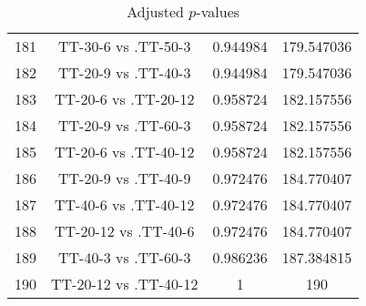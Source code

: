 \documentclass[a4paper,10pt]{article}
\begin{document}
\begin{landscape}
\begin{table}[!htp]
\begin{tabular}{cccc}
181&TT-30-6 vs .TT-50-3&0.944984&179.547036\\
182&TT-20-9 vs .TT-40-3&0.944984&179.547036\\
183&TT-20-6 vs .TT-20-12&0.958724&182.157556\\
184&TT-20-9 vs .TT-60-3&0.958724&182.157556\\
185&TT-20-6 vs .TT-40-12&0.958724&182.157556\\
186&TT-20-9 vs .TT-40-9&0.972476&184.770407\\
187&TT-40-6 vs .TT-40-12&0.972476&184.770407\\
188&TT-20-12 vs .TT-40-6&0.972476&184.770407\\
189&TT-40-3 vs .TT-60-3&0.986236&187.384815\\
190&TT-20-12 vs .TT-40-12&1&190\\
\hline
\end{tabular}
\caption{Adjusted $p$-values}
\end{table}

\end{landscape}
\end{document}
